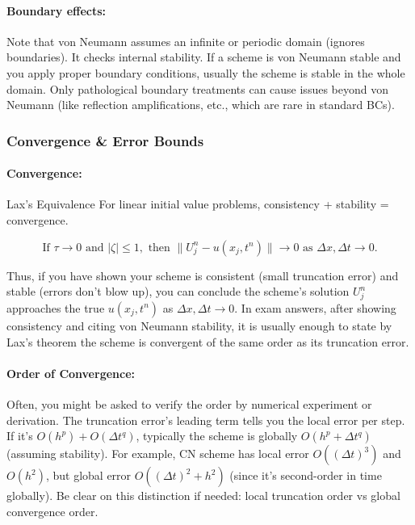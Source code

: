 \documentclass[a4paper,11pt]{article}
\begin{document}
\paragraph{Boundary effects:} Note that von Neumann assumes an infinite or periodic domain (ignores boundaries). It checks internal stability. If a scheme is von Neumann stable and you apply proper boundary conditions, usually the scheme is stable in the whole domain. Only pathological boundary treatments can cause issues beyond von Neumann (like reflection amplifications, etc., which are rare in standard BCs).

\subsubsection{Convergence \& Error Bounds}

\paragraph{Convergence:}
\begin{theorem}{Lax's Equivalence}{}
    For linear initial value problems, consistency + stability = convergence.

    $$\boxed{\text{If } \tau \to 0 \text{ and } |\zeta| \le 1, \text{ then } \|U_j^n - u(x_j,t^n)\| \to 0 \text{ as } \Delta x, \Delta t \to 0.}$$
\end{theorem}
Thus, if you have shown your scheme is consistent (small truncation error) and stable (errors don't blow up), you can conclude the scheme's solution $U_j^n$ approaches the true $u(x_j,t^n)$ as $\Delta x, \Delta t \to 0$. In exam answers, after showing consistency and citing von Neumann stability, it is usually enough to state by Lax's theorem the scheme is convergent of the same order as its truncation error.

\paragraph{Order of Convergence:} Often, you might be asked to verify the order by numerical experiment or derivation. The truncation error's leading term tells you the local error per step. If it's $O(h^p) + O(\Delta t^q)$, typically the scheme is globally $O(h^p + \Delta t^q)$ (assuming stability). For example, CN scheme has local error $O((\Delta t)^3)$ and $O(h^2)$, but global error $O((\Delta t)^2 + h^2)$ (since it's second-order in time globally). Be clear on this distinction if needed: local truncation order vs global convergence order.
\end{document}
